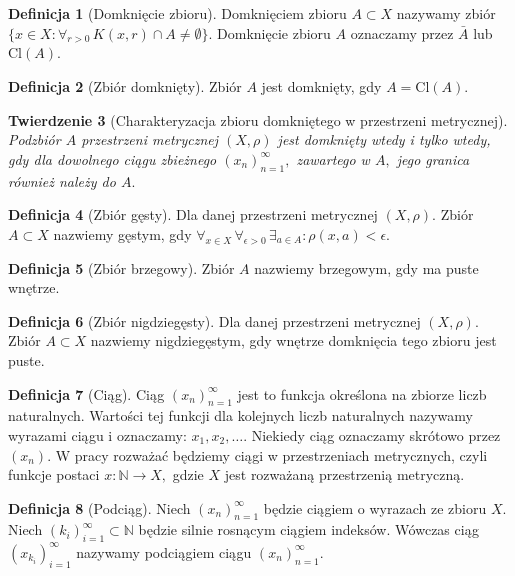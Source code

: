 \documentclass[licencjacka]{pwr_wmat_praca_dyplomowa}
\theoremstyle{plain}
\newtheorem{theorem}{Twierdzenie}
\numberwithin{theorem}{chapter}
\theoremstyle{definition}
\numberwithin{theorem}{chapter}
\newtheorem{definition}[theorem]{Definicja}
\begin{document}
\begin{definition}[Domknięcie zbioru]
Domknięciem zbioru $A \subset X$ nazywamy zbiór $\{x \in X: \forall_{r>0} \, K(x, r) \cap A \neq \emptyset\}$. Domknięcie zbioru $A$ oznaczamy przez $\bar{A}$ lub $\textrm{Cl}(A)$.
\end{definition}

\begin{definition}[Zbiór domknięty]
Zbiór $A$ jest domknięty, gdy $A = \textrm{Cl}(A)$.
\end{definition}



\begin{theorem}[Charakteryzacja zbioru domkniętego w przestrzeni metrycznej]
Podzbiór $A$ przestrzeni metrycznej $(X, \rho)$ jest domknięty wtedy i tylko wtedy, gdy dla dowolnego ciągu zbieżnego $(x_n)_{n=1}^{\infty},$ zawartego w  $A,$ jego granica również należy do $A.$
\end{theorem}



\begin{definition}[Zbiór gęsty]
Dla danej przestrzeni metrycznej $(X, \rho)$. Zbiór $A \subset X$ nazwiemy gęstym, gdy $\forall_{x \in X} \, \forall_{\epsilon>0} \, \exists_{a \in A} : \rho(x, a) < \epsilon$.
\end{definition}

\begin{definition}[Zbiór brzegowy]
Zbiór $A$ nazwiemy brzegowym, gdy ma puste wnętrze.
\end{definition}

\begin{definition}[Zbiór nigdziegęsty]
Dla danej przestrzeni metrycznej $(X, \rho)$. Zbiór $A \subset X$ nazwiemy nigdziegęstym, gdy wnętrze domknięcia tego zbioru jest puste.
\end{definition}


\begin{definition}[Ciąg]
Ciąg $(x_n)_{n=1}^{\infty}$ jest to funkcja określona na zbiorze liczb naturalnych. Wartości tej funkcji dla kolejnych liczb naturalnych nazywamy wyrazami ciągu i oznaczamy: $x_1, x_2, \ldots$. Niekiedy ciąg oznaczamy skrótowo przez $(x_n)$. W pracy rozważać będziemy ciągi w przestrzeniach metrycznych, czyli funkcje postaci $x: \mathbb{N} \rightarrow X,$ gdzie $X$ jest rozważaną przestrzenią metryczną.
\end{definition}


\begin{definition}[Podciąg]
Niech $(x_n)_{n=1}^{\infty}$ będzie ciągiem o wyrazach ze zbioru $X$. Niech $(k_i)_{i=1}^{\infty} \subset \mathbb{N}$ będzie silnie rosnącym ciągiem indeksów. Wówczas ciąg $(x_{k_i})_{i=1}^{\infty}$ nazywamy podciągiem ciągu $(x_n)_{n=1}^{\infty}.$
\end{definition}
\end{document}

